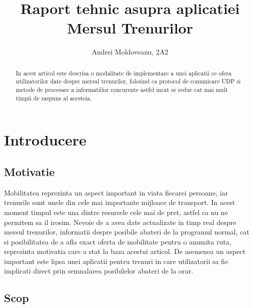 \documentclass[runningheads]{llncs}
\begin{document}
%
\title{Raport tehnic asupra aplicatiei Mersul Trenurilor}
%
%
\author{Andrei Moldoveanu, 2A2}
%
%
%
\maketitle              %
%
\begin{abstract}
 In acest articol este descrisa o modalitate de implementare a unei aplicatii ce ofera utilizatorilor date despre mersul trenurilor, folosind ca protocol de comunicare UDP si metode de procesare a informatiilor concurente astfel incat se reduc cat mai mult timpii de raspuns al acesteia.

\end{abstract}
%
%
\section{Introducere}
\subsection{Motivatie}

 Mobilitatea reprezinta un aspect important in viata fiecarei persoane, iar trenurile sunt unele din cele mai importante mijloace de transport. In acest moment timpul este una dintre resursele cele mai de pret, astfel ca nu ne permitem sa il irosim. Nevoie de a avea date actualizate in timp real despre mersul trenurilor, informatii despre posibile abateri de la programul normal, cat si posibilitatea de a afla exact oferta de mobilitate pentru o anumita ruta, reprezinta motivatia care a stat la baza acestui articol. De asemenea un aspect important este lipsa unei aplicatii pentru trenuri in care utilizatorii sa fie implicati direct prin semnalarea posibilelor abateri de la orar.

\subsection{Scop}
\end{document}
